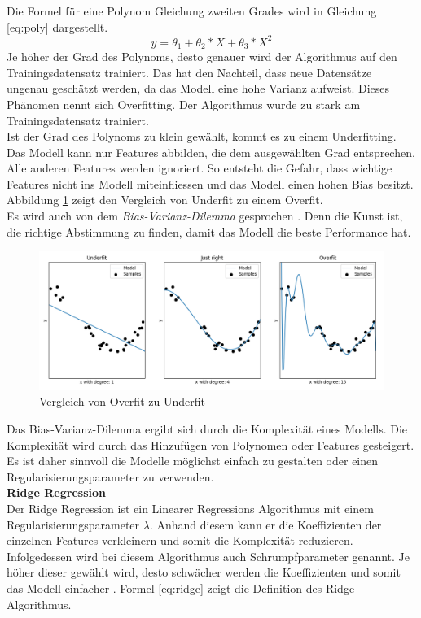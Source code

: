 Die Formel für eine Polynom Gleichung zweiten Grades wird in Gleichung \eqref{eq:poly} dargestellt.
%
\begin{equation}
\label{eq:poly}
y = \theta_1 + \theta_2 * X + \theta_3 * X^2
\end{equation}
%
\newline
Je höher der Grad des Polynoms, desto genauer wird der Algorithmus auf den Trainingsdatensatz trainiert. Das hat den Nachteil, dass neue Datensätze ungenau geschätzt werden, da das Modell eine hohe Varianz aufweist. Dieses Phänomen nennt sich Overfitting. Der Algorithmus wurde zu stark am Trainingsdatensatz trainiert.\\
Ist der Grad des Polynoms zu klein gewählt, kommt es zu einem Underfitting. Das Modell kann nur Features abbilden, die dem ausgewählten Grad entsprechen. Alle anderen Features werden ignoriert. So entsteht die Gefahr, dass wichtige Features nicht ins Modell miteinfliessen und das Modell einen hohen Bias besitzt. Abbildung \ref{fig:under_overfit} zeigt den Vergleich von Underfit zu einem Overfit.\\
Es wird auch von dem \textit{Bias-Varianz-Dilemma} gesprochen \cite{bias_variance, bias_variance_2}. Denn die Kunst ist, die richtige Abstimmung zu finden, damit das Modell die beste Performance hat.
\begin{figure}[ht]
\centering
\includegraphics[width=\textwidth]{images/overfit_underfit.png}
\caption[Vergleich von Overfit zu Underfit]{Vergleich von Overfit zu Underfit}%
\label{fig:under_overfit}
\end{figure}
%
Das Bias-Varianz-Dilemma ergibt sich durch die Komplexität eines Modells. Die Komplexität wird durch das Hinzufügen von Polynomen oder Features gesteigert. 
Es ist daher sinnvoll die Modelle möglichst einfach zu gestalten oder einen Regularisierungsparameter zu verwenden.\\[2ex]
%
\textbf{Ridge Regression}\\
Der Ridge Regression ist ein Linearer Regressions Algorithmus mit einem Regularisierungsparameter $\lambda$. Anhand diesem kann er die Koeffizienten der einzelnen Features verkleinern und somit die Komplexität reduzieren. Infolgedessen wird bei diesem Algorithmus auch Schrumpfparameter genannt. Je höher dieser gewählt wird, desto schwächer werden die Koeffizienten und somit das Modell einfacher \cite{ridge, ridge_2}. Formel \eqref{eq:ridge} zeigt die Definition des Ridge Algorithmus.
